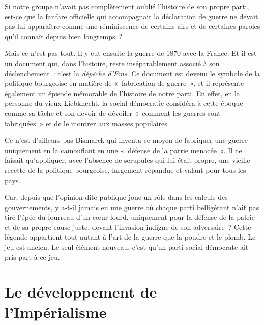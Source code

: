 \documentclass[french,twoside]{book} %
\begin{document}
\noindent Si notre groupe n’avait pas complètement oublié l’histoire de son propre parti, est-ce que la fanfare officielle qui accompagnait la déclaration de guerre ne devait pas lui apparaître comme une réminiscence de certains airs et de certaines paroles qu’il connaît depuis bien longtemps ?\par
Mais ce n’est pas tout. Il y eut ensuite la guerre de 1870 avec la France. Et il est un document qui, dans l’histoire, reste inséparablement associé à son déclenchement : c’est la \emph{dépêche d’Ems}. Ce document est devenu le symbole de la politique bourgeoise en matière de « fabrication de guerre », et il représente également un épisode mémorable de l’histoire de notre parti. En effet, en la personne du vieux Liebknecht, la social-démocratie considéra à cette époque comme sa tâche et son devoir de dévoiler « comment les guerres sont fabriquées » et de le montrer aux masses populaires.\par
Ce n’est d’ailleurs pas Bismarck qui inventa ce moyen de fabriquer une guerre uniquement en la camouflant en une « défense de la patrie menacée ». Il ne faisait qu’appliquer, avec l’absence de scrupules qui lui était propre, une vieille recette de la politique bourgeoise, largement répandue et valant pour tous les pays.\par
Car, depuis que l’opinion dite publique joue un rôle dans les calculs des gouvernements, y a-t-il jamais eu une guerre où chaque parti belligérant n’ait pas tiré l’épée du fourreau d’un cœur lourd, uniquement pour la défense de la patrie et de sa propre cause juste, devant l’invasion indigne de son adversaire ? Cette légende appartient tout autant à l’art de la guerre que la poudre et le plomb. Le jeu est ancien. Le seul élément nouveau, c’est qu’un parti social-démocrate ait pris part à ce jeu.
\section[{Le développement de l’Impérialisme}]{Le développement de l’Impérialisme}\renewcommand{\leftmark}{Le développement de l’Impérialisme}
\end{document}

